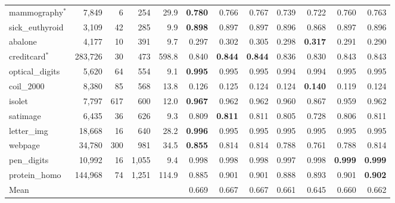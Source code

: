 \begin{tabular}{lrrrrrrrrrrr}
mammography$^\ast$ & 7,849 & 6 & 254 & 29.9 & \textbf{0.780} & 0.766 & 0.767 & 0.739 & 0.722 & 0.760 & 0.763 \\
sick\_euthyroid & 3,109 & 42 & 285 & 9.9 & \textbf{0.898} & 0.897 & 0.897 & 0.896 & 0.868 & 0.897 & 0.896 \\
abalone & 4,177 & 10 & 391 & 9.7 & 0.297 & 0.302 & 0.305 & 0.298 & \textbf{0.317} & 0.291 & 0.290 \\
creditcard$^\ast$ & 283,726 & 30 & 473 & 598.8 & 0.840 & \textbf{0.844} & \textbf{0.844} & 0.836 & 0.830 & 0.843 & 0.843 \\
optical\_digits & 5,620 & 64 & 554 & 9.1 & \textbf{0.995} & 0.995 & 0.995 & 0.994 & 0.994 & 0.995 & 0.995 \\
coil\_2000 & 8,380 & 85 & 568 & 13.8 & 0.126 & 0.125 & 0.124 & 0.124 & \textbf{0.140} & 0.119 & 0.124 \\
isolet & 7,797 & 617 & 600 & 12.0 & \textbf{0.967} & 0.962 & 0.962 & 0.960 & 0.867 & 0.959 & 0.962 \\
satimage & 6,435 & 36 & 626 & 9.3 & 0.809 & \textbf{0.811} & 0.811 & 0.805 & 0.728 & 0.806 & 0.811 \\
letter\_img & 18,668 & 16 & 640 & 28.2 & \textbf{0.996} & 0.995 & 0.995 & 0.995 & 0.995 & 0.995 & 0.995 \\
webpage & 34,780 & 300 & 981 & 34.5 & \textbf{0.855} & 0.814 & 0.814 & 0.788 & 0.761 & 0.788 & 0.814 \\
pen\_digits & 10,992 & 16 & 1,055 & 9.4 & 0.998 & 0.998 & 0.998 & 0.997 & 0.998 & \textbf{0.999} & \textbf{0.999} \\
protein\_homo & 144,968 & 74 & 1,251 & 114.9 & 0.885 & 0.901 & 0.901 & 0.888 & 0.893 & 0.901 & \textbf{0.902} \\
\midrule
Mean & & & & & 0.669 & 0.667 & 0.667 & 0.661 & 0.645 & 0.660 & 0.662 \\
\bottomrule
\end{tabular}
